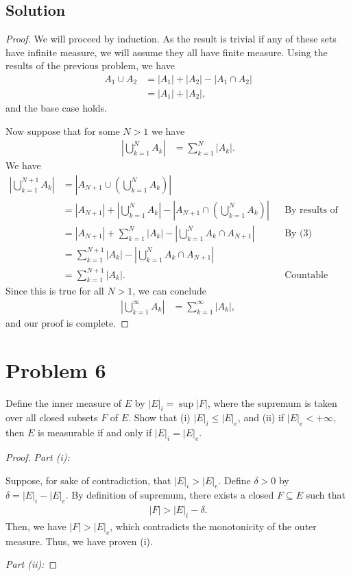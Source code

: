 \documentclass[10pt,a4paper]{article}
\makeatletter
\theoremstyle{theorem}
\newcommand{\proofpart}[2]{%
  \par
  \addvspace{\medskipamount}%
  \noindent\emph{Part #1: #2}\par\nobreak
  \addvspace{\smallskipamount}%
  \@afterheading
}
\theoremstyle{definition}
\makeatother
\begin{document}
\subsection*{Solution}
\begin{proof}
We will proceed by induction.  As the result is trivial if any of these sets have infinite measure, we will assume they all have finite measure. Using the results of the previous problem, we have
\begin{align*}
A_1 \cup A_2 &= |A_1| + |A_2| - |A_1 \cap A_2|\\
&= |A_1| + |A_2|,
\end{align*}
and the base case holds.

Now suppose that for some $N > 1$ we have 
\begin{align}
\left| \bigcup_{k=1}^N A_k \right| &= \sum_{k=1}^N |A_k|.
\end{align}
We have 
\begin{align*}
\left| \bigcup_{k=1}^{N+1} A_k \right| &= \left| A_{N+1} \cup \left(\bigcup_{k=1}^N A_k \right) \right|\\
&= |A_{N+1}| + \left| \bigcup_{k=1}^N A_k \right| -   \left| A_{N+1} \cap \left(\bigcup_{k=1}^N A_k \right) \right| &&\text{By results of previous problem}\\
&= |A_{N+1}| + \sum_{k=1}^N |A_k| - \left| \bigcup_{k=1}^N A_k \cap A_{N+1} \right|  &&\text{By (3)}\\
&=\sum_{k=1}^{N + 1} |A_k| - \left| \bigcup_{k=1}^N A_k \cap A_{N+1} \right| \\
&= \sum_{k=1}^{N + 1} |A_k|. &&\text{Countable union of sets of measure zero}
\end{align*}
Since this is true for all $N > 1$, we can conclude 
\begin{align*}
\left| \bigcup_{k=1}^\infty A_k \right| &= \sum_{k=1}^\infty |A_k|,
\end{align*}
and our proof is complete.
\end{proof}

\section*{Problem 6}
Define the inner measure of $E$ by $|E|_i = \sup|F|$, where the supremum is taken over all closed subsets $F$ of $E$. Show that (i) $|E|_i \leq |E|_e$,  and (ii) if $|E|_e < + \infty$, then $E$ is measurable if and only if $|E|_i = |E|_e$.
\begin{proof}
\proofpart{(i)}{} Suppose, for sake of contradiction, that $|E|_i > |E|_e$. Define $\delta > 0$ by $\delta = |E|_i - |E|_e$. By definition of supremum, there exists a closed $F \subseteq E$ such that 
\begin{align*}
|F| > |E|_i - \delta.
\end{align*}
Then, we have $|F| > |E|_e$, which contradicts the monotonicity of the outer measure. Thus, we have proven (i).

\proofpart{(ii)}{}
\end{proof}
\end{document}

